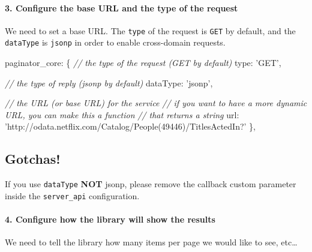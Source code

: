\documentclass[9pt]{book}
\newenvironment{Shaded}{}{}
\newcommand{\DataTypeTok}[1]{\textcolor[rgb]{0.56,0.13,0.00}{{#1}}}
\newcommand{\StringTok}[1]{\textcolor[rgb]{0.25,0.44,0.63}{{#1}}}
\newcommand{\CommentTok}[1]{\textcolor[rgb]{0.38,0.63,0.69}{\textit{{#1}}}}
\newcommand{\NormalTok}[1]{{#1}}
\begin{document}
\paragraph{3. Configure the base URL and the type of the
request}\label{configure-the-base-url-and-the-type-of-the-request}

We need to set a base URL. The \texttt{type} of the request is
\texttt{GET} by default, and the \texttt{dataType} is \texttt{jsonp} in
order to enable cross-domain requests.

\begin{Shaded}
\begin{Highlighting}[]
    \NormalTok{paginator_core: \{}
      \CommentTok{// the type of the request (GET by default)}
      \DataTypeTok{type}\NormalTok{: }\StringTok{'GET'}\NormalTok{,}

      \CommentTok{// the type of reply (jsonp by default)}
      \DataTypeTok{dataType}\NormalTok{: }\StringTok{'jsonp'}\NormalTok{,}

      \CommentTok{// the URL (or base URL) for the service}
      \CommentTok{// if you want to have a more dynamic URL, you can make this a function}
      \CommentTok{// that returns a string}
      \DataTypeTok{url}\NormalTok{: }\StringTok{'http://odata.netflix.com/Catalog/People(49446)/TitlesActedIn?'}
    \NormalTok{\},}
\end{Highlighting}
\end{Shaded}

\subsection{Gotchas!}\label{gotchas}

If you use \texttt{dataType} \textbf{NOT} jsonp, please remove the
callback custom parameter inside the \texttt{server\_api} configuration.

\paragraph{4. Configure how the library will show the
results}\label{configure-how-the-library-will-show-the-results}

We need to tell the library how many items per page we would like to
see, etc\ldots{}
\end{document}

